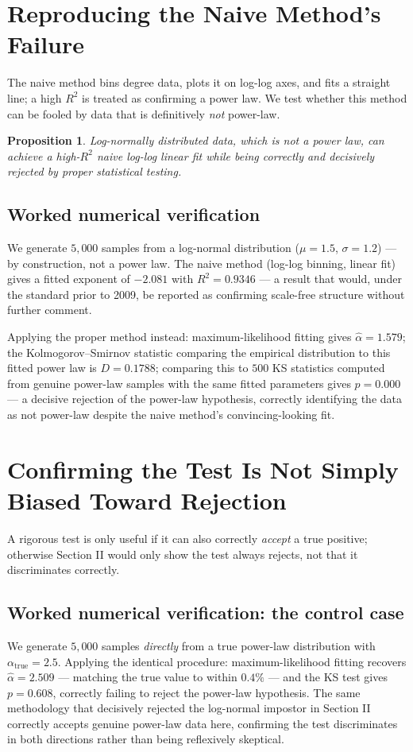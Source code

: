 \documentclass[10pt,journal,compsoc]{IEEEtran}
\newtheorem{proposition}{Proposition}
\begin{document}
\section{Reproducing the Naive Method's Failure}
The naive method bins degree data, plots it on log-log axes, and fits a straight line; a high $R^2$ is treated as confirming a power law. We test whether this method can be fooled by data that is definitively \emph{not} power-law.

\begin{proposition}
Log-normally distributed data, which is not a power law, can achieve a high-$R^2$ naive log-log linear fit while being correctly and decisively rejected by proper statistical testing.
\end{proposition}

\subsection{Worked numerical verification}
We generate $5{,}000$ samples from a log-normal distribution ($\mu=1.5$, $\sigma=1.2$) --- by construction, not a power law. The naive method (log-log binning, linear fit) gives a fitted exponent of $-2.081$ with $R^2=0.9346$ --- a result that would, under the standard prior to 2009, be reported as confirming scale-free structure without further comment.

Applying the proper method instead: maximum-likelihood fitting gives $\hat\alpha=1.579$; the Kolmogorov--Smirnov statistic comparing the empirical distribution to this fitted power law is $D=0.1788$; comparing this to $500$ KS statistics computed from genuine power-law samples with the same fitted parameters gives $p=0.000$ --- a decisive rejection of the power-law hypothesis, correctly identifying the data as not power-law despite the naive method's convincing-looking fit.

\section{Confirming the Test Is Not Simply Biased Toward Rejection}
A rigorous test is only useful if it can also correctly \emph{accept} a true positive; otherwise Section II would only show the test always rejects, not that it discriminates correctly.

\subsection{Worked numerical verification: the control case}
We generate $5{,}000$ samples \emph{directly} from a true power-law distribution with $\alpha_{\mathrm{true}}=2.5$. Applying the identical procedure: maximum-likelihood fitting recovers $\hat\alpha=2.509$ --- matching the true value to within $0.4\%$ --- and the KS test gives $p=0.608$, correctly failing to reject the power-law hypothesis. The same methodology that decisively rejected the log-normal impostor in Section II correctly accepts genuine power-law data here, confirming the test discriminates in both directions rather than being reflexively skeptical.
\end{document}

